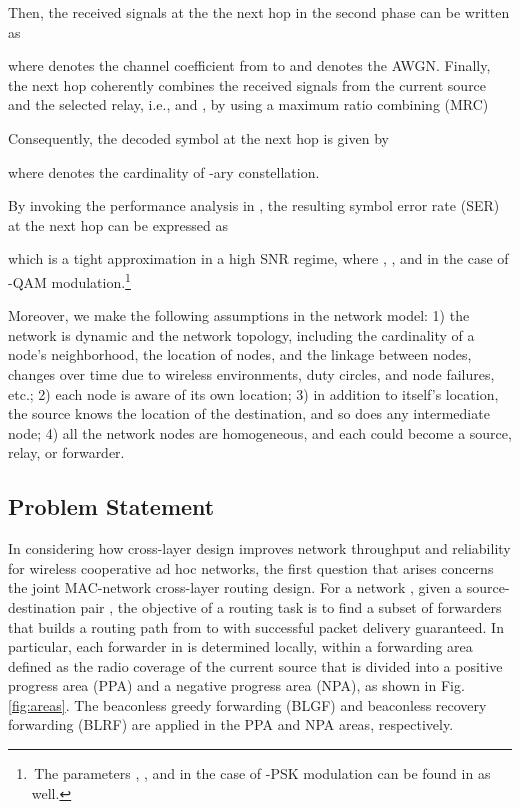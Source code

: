 \documentclass[journal,twoside,final]{IEEEtran}
\begin{document}
Then, the received signals at the the next hop in the second phase can be written as

where  denotes the channel coefficient from  to  and  denotes the AWGN.
Finally, the next hop coherently combines the received signals from the current source and the selected relay, i.e.,  and , by using a maximum ratio combining (MRC)

Consequently, the decoded symbol  at the next hop is given by

where  denotes the cardinality of -ary constellation.

By invoking the performance analysis in \cite{Su08}, the resulting symbol error rate (SER) at the next hop can be expressed as

which is a tight approximation in a high SNR regime, where ,
, and  in the case of -QAM modulation.\footnote{\,The parameters , , and  in the case of -PSK modulation can be found in \cite{Su08} as well.}




Moreover, we make the following assumptions in the network model:
1) the network is dynamic and the network topology, including the cardinality of a node's neighborhood, the location of nodes, and the linkage between nodes, changes over time due to wireless environments, duty circles, and node failures, etc.; 2) each node is aware of its own location; 3) in addition to itself's location, the source knows the location of the destination, and so does any intermediate node; 4) all the network nodes are homogeneous, and each could become a source, relay, or forwarder.

\subsection{Problem Statement}\label{Statement}
In considering how cross-layer design improves network throughput and reliability for wireless cooperative ad hoc networks, the first question that arises concerns the joint MAC-network cross-layer routing design. For a network , given a source-destination pair , the objective of a routing task is to find a subset of forwarders  that builds a routing path from  to  with successful packet delivery guaranteed. In particular, each forwarder in  is determined locally, within a forwarding area defined as the radio coverage of the current source that is divided into a positive progress area (PPA) and a negative progress area (NPA), as shown in Fig. \ref{fig:areas}. The beaconless greedy forwarding (BLGF) and beaconless recovery forwarding (BLRF) are applied in the PPA and NPA areas, respectively.
\end{document}
